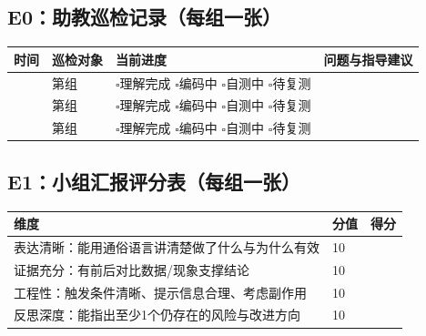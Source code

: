 \documentclass[UTF8,a4paper,12pt]{ctexart}
\begin{document}
\subsection*{E0：助教巡检记录（每组一张）}
\begin{longtable}{@{}p{}p{}p{}p{}@{}}
\toprule
\textbf{时间} & \textbf{巡检对象} & \textbf{当前进度} & \textbf{问题与指导建议} \\
\midrule
\endhead
\underline{\hspace{6em}} & 第\underline{\hspace{2em}}组 & $\square$理解完成 $\square$编码中 $\square$自测中 $\square$待复测 & \underline{\hspace{20em}} \\
\underline{\hspace{6em}} & 第\underline{\hspace{2em}}组 & $\square$理解完成 $\square$编码中 $\square$自测中 $\square$待复测 & \underline{\hspace{20em}} \\
\underline{\hspace{6em}} & 第\underline{\hspace{2em}}组 & $\square$理解完成 $\square$编码中 $\square$自测中 $\square$待复测 & \underline{\hspace{20em}} \\
\bottomrule
\end{longtable}

\subsection*{E1：小组汇报评分表（每组一张）}
\begin{longtable}{@{}p{}p{}p{}@{}}
\toprule
\textbf{维度} & \textbf{分值} & \textbf{得分} \\
\midrule
\endhead
表达清晰：能用通俗语言讲清楚做了什么与为什么有效 & 10 & \underline{\hspace{6em}} \\
证据充分：有前后对比数据/现象支撑结论 & 10 & \underline{\hspace{6em}} \\
工程性：触发条件清晰、提示信息合理、考虑副作用 & 10 & \underline{\hspace{6em}} \\
反思深度：能指出至少1个仍存在的风险与改进方向 & 10 & \underline{\hspace{6em}} \\
\bottomrule
\end{longtable}
\end{document}
